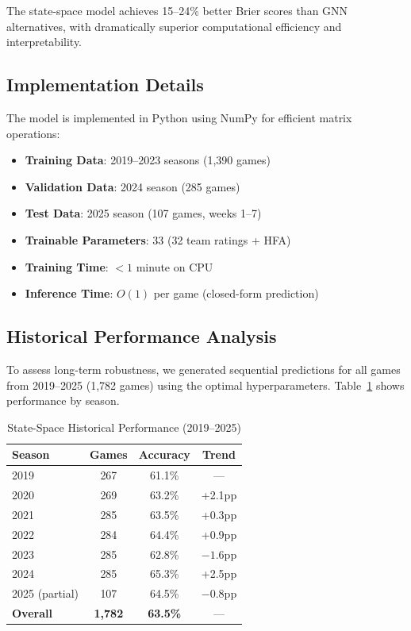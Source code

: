 The state-space model achieves 15--24\% better Brier scores than GNN alternatives, with dramatically superior computational efficiency and interpretability.

\subsection{Implementation Details}

The model is implemented in Python using NumPy for efficient matrix operations:

\begin{itemize}
    \item \textbf{Training Data}: 2019--2023 seasons (1,390 games)
    \item \textbf{Validation Data}: 2024 season (285 games)
    \item \textbf{Test Data}: 2025 season (107 games, weeks 1--7)
    \item \textbf{Trainable Parameters}: 33 (32 team ratings + HFA)
    \item \textbf{Training Time}: $<1$ minute on CPU
    \item \textbf{Inference Time}: $O(1)$ per game (closed-form prediction)
\end{itemize}

\subsection{Historical Performance Analysis}

To assess long-term robustness, we generated sequential predictions for all games from 2019--2025 (1,782 games) using the optimal hyperparameters. Table~\ref{tab:state-space-by-season} shows performance by season.

\begin{table}[h]
\centering
\caption{State-Space Historical Performance (2019--2025)}
\label{tab:state-space-by-season}
\begin{tabular}{lccc}
\toprule
\textbf{Season} & \textbf{Games} & \textbf{Accuracy} & \textbf{Trend} \\
\midrule
2019 & 267 & 61.1\% & --- \\
2020 & 269 & 63.2\% & +2.1pp \\
2021 & 285 & 63.5\% & +0.3pp \\
2022 & 284 & 64.4\% & +0.9pp \\
2023 & 285 & 62.8\% & $-1.6$pp \\
2024 & 285 & 65.3\% & +2.5pp \\
2025 (partial) & 107 & 64.5\% & $-0.8$pp \\
\midrule
\textbf{Overall} & \textbf{1,782} & \textbf{63.5\%} & --- \\
\bottomrule
\end{tabular}
\end{table}

